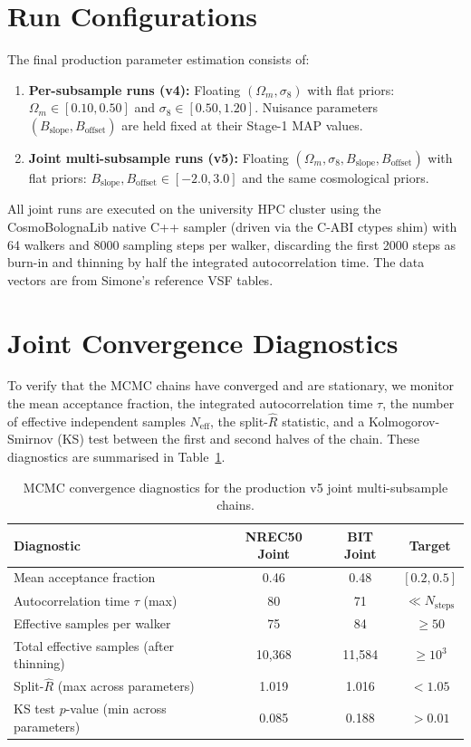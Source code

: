 \documentclass[12pt]{report}
\begin{document}
\section{Run Configurations}

The final production parameter estimation consists of:
\begin{enumerate}
    \item \textbf{Per-subsample runs (v4):} Floating $(\Omega_m, \sigma_8)$ with flat priors: $\Omega_m \in [0.10, 0.50]$ and $\sigma_8 \in [0.50, 1.20]$. Nuisance parameters $(B_{\mathrm{slope}}, B_{\mathrm{offset}})$ are held fixed at their Stage-1 MAP values.
    \item \textbf{Joint multi-subsample runs (v5):} Floating $(\Omega_m, \sigma_8, B_{\mathrm{slope}}, B_{\mathrm{offset}})$ with flat priors: $B_{\mathrm{slope}}, B_{\mathrm{offset}} \in [-2.0, 3.0]$ and the same cosmological priors.
\end{enumerate}

All joint runs are executed on the university HPC cluster using the CosmoBolognaLib native C++ sampler (driven via the C-ABI ctypes shim) with 64 walkers and 8000 sampling steps per walker, discarding the first 2000 steps as burn-in and thinning by half the integrated autocorrelation time. The data vectors are from Simone's reference VSF tables.

\section{Joint Convergence Diagnostics}

To verify that the MCMC chains have converged and are stationary, we monitor the mean acceptance fraction, the integrated autocorrelation time $\tau$, the number of effective independent samples $N_{\mathrm{eff}}$, the split-$\hat{R}$ statistic, and a Kolmogorov-Smirnov (KS) test between the first and second halves of the chain. These diagnostics are summarised in Table~\ref{tab:appendix_convergence}.

\begin{table}[H]
    \centering
    \caption{MCMC convergence diagnostics for the production v5 joint multi-subsample chains.}
    \label{tab:appendix_convergence}
    \begin{tabular}{lccc}
        \toprule
        \textbf{Diagnostic} & \textbf{NREC50 Joint} & \textbf{BIT Joint} & \textbf{Target} \\
        \midrule
        Mean acceptance fraction & 0.46 & 0.48 & $[0.2, 0.5]$ \\
        Autocorrelation time $\tau$ (max) & 80 & 71 & $\ll N_{\mathrm{steps}}$ \\
        Effective samples per walker & 75 & 84 & $\ge 50$ \\
        Total effective samples (after thinning) & 10,368 & 11,584 & $\ge 10^3$ \\
        Split-$\hat{R}$ (max across parameters) & 1.019 & 1.016 & $< 1.05$ \\
        KS test $p$-value (min across parameters) & 0.085 & 0.188 & $> 0.01$ \\
        \bottomrule
    \end{tabular}
\end{table}
\end{document}

